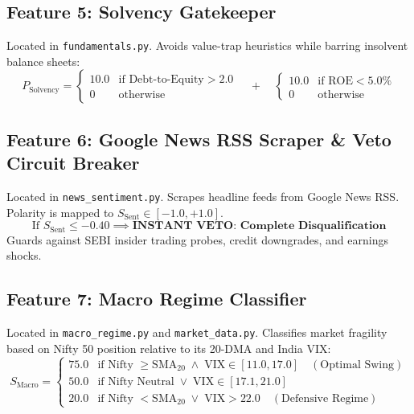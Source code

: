 \documentclass[11pt,a4paper]{article}
\begin{document}
\subsection{Feature 5: Solvency Gatekeeper}
Located in \texttt{fundamentals.py}. Avoids value-trap heuristics while barring insolvent balance sheets:
\begin{equation}
P_{\text{Solvency}} = \begin{cases} 10.0 & \text{if } \text{Debt-to-Equity} > 2.0 \\ 0 & \text{otherwise} \end{cases} \quad + \quad \begin{cases} 10.0 & \text{if } \text{ROE} < 5.0\% \\ 0 & \text{otherwise} \end{cases}
\end{equation}

\subsection{Feature 6: Google News RSS Scraper \& Veto Circuit Breaker}
Located in \texttt{news\_sentiment.py}. Scrapes headline feeds from Google News RSS. Polarity is mapped to $S_{\text{Sent}} \in [-1.0, +1.0]$.
\begin{equation}
\text{If } S_{\text{Sent}} \le -0.40 \implies \textbf{INSTANT VETO: Complete Disqualification}
\end{equation}
Guards against SEBI insider trading probes, credit downgrades, and earnings shocks.

\subsection{Feature 7: Macro Regime Classifier}
Located in \texttt{macro\_regime.py} and \texttt{market\_data.py}. Classifies market fragility based on Nifty 50 position relative to its 20-DMA and India VIX:
\begin{equation}
S_{\text{Macro}} = \begin{cases}
75.0 & \text{if Nifty } \ge \text{SMA}_{20} \;\land\; \text{VIX} \in [11.0, 17.0] \quad (\text{Optimal Swing}) \\
50.0 & \text{if Nifty Neutral} \;\lor\; \text{VIX} \in [17.1, 21.0] \\
20.0 & \text{if Nifty } < \text{SMA}_{20} \;\lor\; \text{VIX} > 22.0 \quad (\text{Defensive Regime})
\end{cases}
\end{equation}
\end{document}
